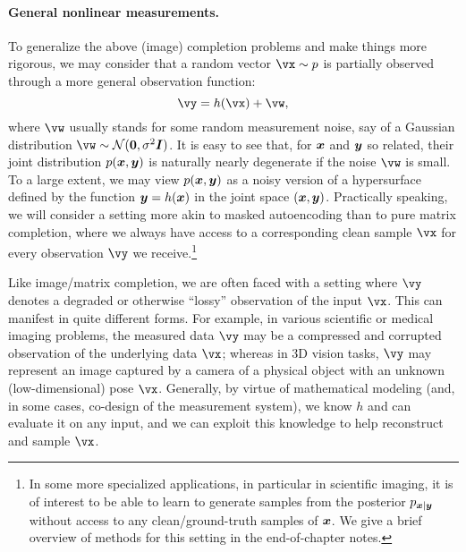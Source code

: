 \documentclass[../../book-main.tex]{subfiles}
\begin{document}
\paragraph{General nonlinear measurements.}
To generalize the above (image) completion problems and make things more rigorous, we may consider that a random vector $\vx \sim p$ is partially observed through a more
general observation function:
\begin{equation}\label{eq:measurement-matching-observation}
\vy = h(\vx) + \vw,
\end{equation}
where $\vw$ usually stands for some random measurement noise, say of
a Gaussian distribution $\vw \sim \mathcal{N}(\mathbf{0}, \sigma^2
\boldsymbol{I})$. It is easy to see that, for $\bm{x}$ and $\bm{y}$ so related, their joint distribution $p(\bm{x}, \bm{y})$ is naturally nearly degenerate if the noise $\vw$ is small. To a large extent, we may view $p(\bm{x}, \bm{y})$ as a noisy version of a hypersurface defined by the function $\bm{y} = h(\bm{x})$ in the joint space $(\bm{x}, \bm{y})$.  Practically speaking, we will consider a setting more akin to masked autoencoding than to pure matrix completion, where we always have access to a corresponding clean sample $\vx$ for every observation $\vy$ we receive.\footnote{In some more specialized applications, in particular in scientific imaging, it is of interest to be able to learn to generate samples from the posterior $p_{\bm{x} \mid \bm{y}}$ without access to any clean/ground-truth samples of $\bm{x}$. We give a brief overview of methods for this setting in the end-of-chapter notes.}

Like image/matrix completion, we
are often faced with a setting where $\vy$ denotes a degraded or otherwise
``lossy''
observation of the input $\vx$. This can manifest in quite different
forms. For example, in various scientific or
medical imaging problems, the measured data $\vy$ may be a compressed and
corrupted observation of the underlying data $\vx$; whereas in 3D vision tasks,
$\vy$ may represent an image captured by a camera of a physical object with an
unknown (low-dimensional) pose $\vx$.
Generally, by virtue of mathematical modeling (and, in some cases, co-design
of the measurement system), we know $h$ and can evaluate it on any input, and
we can exploit this knowledge to help reconstruct and sample $\vx$.
\end{document}
